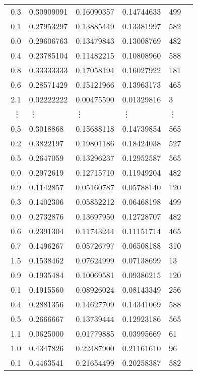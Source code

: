 \documentclass[11pt]{article}
\begin{document}
\begin{tabular}{r|lllll}
	  0.3       & 0.30909091 & 0.16090357 & 0.14744633 & 499       \\
	  0.1       & 0.27953297 & 0.13885449 & 0.13381997 & 582       \\
	  0.0       & 0.29606763 & 0.13479843 & 0.13008769 & 482       \\
	  0.4       & 0.23785104 & 0.11482215 & 0.10808960 & 588       \\
	  0.8       & 0.33333333 & 0.17058194 & 0.16027922 & 181       \\
	  0.6       & 0.28571429 & 0.15121966 & 0.13963173 & 465       \\
	  2.1       & 0.02222222 & 0.00475590 & 0.01329816 &   3       \\
	 ⋮ & ⋮ & ⋮ & ⋮ & ⋮\\
	  0.5       & 0.3018868  & 0.15688118 & 0.14739854 & 565       \\
	  0.2       & 0.3822197  & 0.19801186 & 0.18424038 & 527       \\
	  0.5       & 0.2647059  & 0.13296237 & 0.12952587 & 565       \\
	  0.0       & 0.2972619  & 0.12715710 & 0.11949204 & 482       \\
	  0.9       & 0.1142857  & 0.05160787 & 0.05788140 & 120       \\
	  0.3       & 0.1402306  & 0.05852212 & 0.06468198 & 499       \\
	  0.0       & 0.2732876  & 0.13697950 & 0.12728707 & 482       \\
	  0.6       & 0.2391304  & 0.11743244 & 0.11151714 & 465       \\
	  0.7       & 0.1496267  & 0.05726797 & 0.06508188 & 310       \\
	  1.5       & 0.1538462  & 0.07624999 & 0.07138699 &  13       \\
	  0.9       & 0.1935484  & 0.10069581 & 0.09386215 & 120       \\
	 -0.1       & 0.1915560  & 0.08926024 & 0.08143349 & 256       \\
	  0.4       & 0.2881356  & 0.14627709 & 0.14341069 & 588       \\
	  0.5       & 0.2666667  & 0.13739444 & 0.12923186 & 565       \\
	  1.1       & 0.0625000  & 0.01779885 & 0.03995669 &  61       \\
	  1.0       & 0.4347826  & 0.22487900 & 0.21161610 &  96       \\
	  0.1       & 0.4463541  & 0.21654499 & 0.20258387 & 582       \\

\end{tabular}
\end{document}
